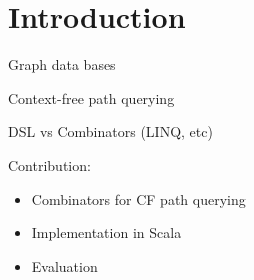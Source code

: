 \section{Introduction}
Graph data bases

Context-free path querying

DSL vs Combinators (LINQ, etc)


Contribution:
\begin{itemize}
\item Combinators for CF path querying
\item Implementation in Scala
\item Evaluation
\end{itemize}